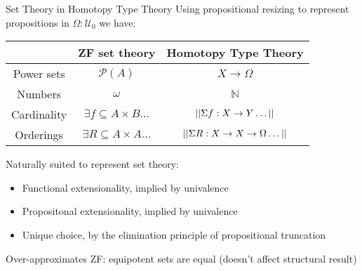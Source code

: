 \documentclass[xcolor=dvipsnames,compress,aspectratio=169,handout]{beamer}
\newcommand{\MBB}[1]{\ensuremath{\mathbb{#1}}\xspace}  %
\newcommand{\MCL}[1]{\ensuremath{\mathcal{#1}}\xspace} %
\newcommand{\Nat}{\MBB{N}}   %
\newcommand{\Pow}{\MCL P}
\newcommand{\Prop}{\MBB P}
\begin{document}
\begin{frame}{Set Theory in Homotopy Type Theory}
	Using propositional resizing to represent propositions in $\Omega:\mathcal{U}_0$ we have:

	\vspace{0.1cm}
	\begin{center}
	\begin{tabular}{c|c|c}
				&ZF set theory&Homotopy Type Theory\\\hline
				\vphantom{\vdots}Power sets&$\Pow(A)$&$X\to\Omega$\\[0.2cm]
				Numbers&$\omega$&$\Nat$\\[0.2cm]
				Cardinality&$\exists f\subseteq A\times B\dots$&$||\Sigma f:X\to Y\dots||$\\[0.2cm]
				Orderings&$\exists R\subseteq A\times A\dots$&$||\Sigma R:X\to X\to\Omega\dots||$
	\end{tabular}
	\end{center}
	
	\pause
	\vspace{0.1cm}
	Naturally suited to represent set theory:
	\begin{itemize}
	\item Functional extensionality, implied by univalence
	\item Propositonal extensionality, implied by univalence
	\item Unique choice, by the elimination principle of propositional truncation
	\end{itemize}
	
	\pause
	\vspace{0.3cm}
	Over-approximates ZF: equipotent sets are equal (doesn't affect structural result)
\end{frame}
\end{document}
